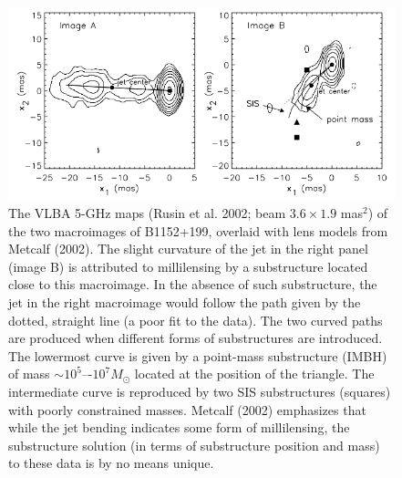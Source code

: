 \documentclass[a4paper, 11pt]{article}
\begin{document}
\begin{figure}[tbh]
\centering
\includegraphics[scale=0.75]{Figure_2002.jpg}
\caption{The VLBA 5-GHz maps (Rusin et al. 2002; beam $3.6 \times 1.9$ mas$^2$) of the two macroimages of B1152+199, overlaid with lens models from Metcalf (2002). The slight curvature of the jet in the right panel (image B) is attributed to millilensing by a substructure located close to this macroimage. In the absence of such substructure, the jet in the right macroimage would follow the path given by the dotted, straight line (a poor fit to the data). The two curved paths are produced when different forms of substructures are introduced. The lowermost curve is given by a point-mass substructure (IMBH) of mass $\sim 10^5$–-$10^7 M_\odot$ located at the position of the triangle. The intermediate curve is reproduced by two SIS substructures (squares) with poorly constrained masses. Metcalf (2002) emphasizes that while the jet bending indicates some form of millilensing, the substructure solution (in terms of substructure position and mass) to these data is by no means unique.}
\end{figure}
\end{document}
